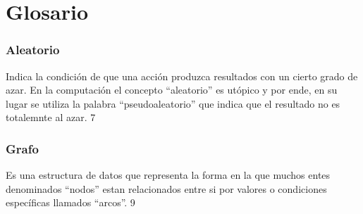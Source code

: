 \chapter*{Glosario}


\subsection*{Aleatorio}
Indica la condición de que una acción produzca resultados con un cierto grado de azar. En la computación el concepto ``aleatorio'' es utópico y por ende, en su lugar se utiliza la palabra ``pseudoaleatorio'' que indica que el resultado no es totalemnte al azar. 7

\subsection*{Grafo}
Es una estructura de datos que representa la forma en la que muchos entes denominados ``nodos'' estan relacionados entre si por valores o condiciones específicas llamados ``arcos''. 9
